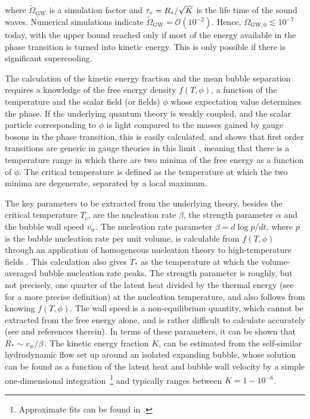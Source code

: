 \documentclass[11pt,a4paper]{article}
\begin{document}
where $\tilde\Omega_\text{GW} $ is a simulation factor and $\tau _{\rm v} = R_\ast /\sqrt{K}$ is the life time of the sound waves. Numerical simulations indicate $\tilde\Omega_\text{GW} = \mathcal{O}\left(10^{-2}\right).$
Hence, $\Omega_{\text{GW},0} \lesssim 10^{-7}$ today, with the upper bound reached only if most of the energy available in the phase transition
is turned into kinetic energy.  This is only possible if there is significant supercooling. \par
The calculation of the kinetic energy fraction and the mean bubble separation requires a knowledge of the free energy density $f(T,\phi)$, a function of the temperature and the scalar field (or fields) $\phi$ whose expectation value determines the phase. If the underlying quantum theory is weakly coupled, and the scalar particle corresponding to $\phi$ is light compared to the masses gained by gauge bosons in the phase transition, this is easily calculated, and shows that first order transitions are generic in gauge theories in this limit \cite{Kirzhnits:1972iw,Kirzhnits:1976ts}, meaning that there is a temperature range in which there are two minima of the free energy as a function of $\phi$.  The critical temperature is defined as the temperature at which the two minima are degenerate, separated by a local maximum. \par

The key parameters to be extracted from the underlying theory, besides the critical temperature $T_c$, are the nucleation rate $\beta$, the strength parameter $\alpha$ and the bubble wall speed $v_w$. The nucleation rate parameter $\beta = d \log p/dt$, where $p$ is the bubble nucleation rate per unit volume, is calculable from $f(T,\phi)$ through an application of homogeneous nucleation theory \cite{Langer:1969bc} to high-temperature fields \cite{Linde:1981zj}.
This calculation also gives $T_\ast $ as the temperature at which the volume-averaged bubble nucleation rate peaks.
The strength parameter is roughly, but not precisely, one quarter of the latent heat divided by the thermal energy (see~\cite{Hindmarsh:2019phv} for a more precise definition) at the nucleation temperature, and  also follows from knowing  $f(T,\phi)$.
The wall speed is a non-equilibrium quantity, which cannot be extracted from the free energy alone, and is rather difficult to calculate accurately (see \cite{Dorsch:2018pat, Laurent:2020gpg} and references therein). In terms of these parameters, it can be shown that \cite{Enqvist:1991xw} $ R_\ast \sim  v_w/\beta  \,.$
The kinetic energy fraction $K$, can be estimated from the self-similar hydrodynamic flow set up around an isolated expanding bubble, whose solution can be found as a function of the latent heat and bubble wall velocity by  a simple one-dimensional integration~\cite{Turner:1992tz,Espinosa:2010hh,Hindmarsh:2019phv}\footnote{Approximate fits can be found in \cite{Espinosa:2010hh}.} and typically ranges between $K = 1-10^{-6}$. \par
\end{document}
